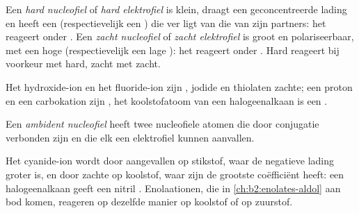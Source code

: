 \begin{definition}\label{def:b2:frontier-orbitals:hard-soft}
Een \emph{hard nucleofiel} of \emph{hard elektrofiel}
 is klein, draagt een geconcentreerde lading en heeft
een  (respectievelijk een ) die ver ligt van die van zijn partners: het reageert onder .
Een \emph{zacht nucleofiel} of \emph{zacht elektrofiel}
 is groot en polariseerbaar, met een hoge 
(respectievelijk een lage ): het reageert onder . Hard reageert bij voorkeur
met hard, zacht met zacht.
\end{definition}

Het hydroxide-ion en het fluoride-ion zijn , jodide en thiolaten
zachte; een proton en een carbokation zijn , het koolstofatoom van een
halogeenalkaan is een .

\begin{definition}\label{def:b2:frontier-orbitals:ambident}
Een \emph{ambident nucleofiel} heeft twee nucleofiele atomen
die door conjugatie verbonden zijn en die elk een elektrofiel kunnen aanvallen.
\end{definition}

Het cyanide-ion wordt door  aangevallen op stikstof, waar de negatieve lading groter is,
en door zachte op koolstof, waar zijn  de grootste coëfficiënt heeft:
een halogeenalkaan geeft een nitril . Enolaationen, die in
\cref{ch:b2:enolates-aldol} aan bod komen, reageren op dezelfde manier op koolstof of op zuurstof.

